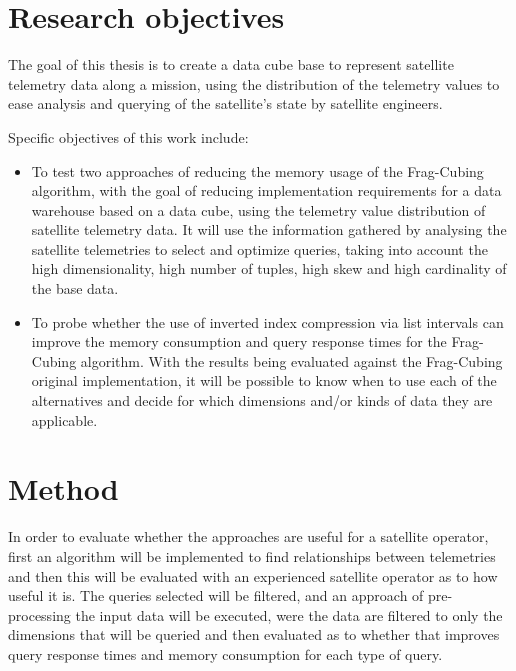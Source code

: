 \section{Research objectives}\label{ch:intro:obj}


The goal of this thesis is to create a data cube base to represent satellite telemetry data along a mission, using the distribution of the telemetry values to ease analysis and querying of the satellite's state by satellite engineers.

Specific objectives of this work include:

\begin{itemize}[noitemsep]
  \item To test two approaches of reducing the memory usage of the Frag-Cubing algorithm, with the goal of reducing implementation requirements for a data warehouse based on a data cube, using the telemetry value distribution of satellite telemetry data.
It will use the information gathered by analysing the satellite telemetries to select and optimize queries, taking into account the high dimensionality, high number of tuples, high skew and high cardinality of the base data.
  \item To probe whether the use of inverted index compression via list intervals can improve the memory consumption and query response times for the Frag-Cubing algorithm.
  With the results being evaluated against the Frag-Cubing original implementation, it will be possible to know when to use each of the alternatives and decide for which dimensions and/or kinds of data they are applicable.
\end{itemize}

\section{Method}\label{ch:intro:method}

In order to evaluate whether the approaches are useful for a satellite operator, first an algorithm will be implemented to find relationships between telemetries and then this will be evaluated with an experienced satellite operator as to how useful it is.
The queries selected will be filtered, and an approach of pre-processing the input data will be executed, were the data are filtered to only the dimensions that will be queried and then evaluated as to whether that improves query response times and memory consumption for each type of query.

